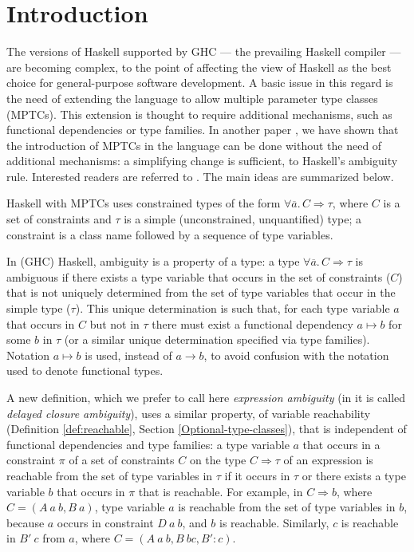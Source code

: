 \section{Introduction}
\label{sec:intro}

The versions of Haskell supported by GHC \cite{GHC} --- the prevailing
Haskell compiler --- are becoming complex, to the point of affecting
the view of Haskell as the best choice for general-purpose software
development. A basic issue in this regard is the need of extending the
language to allow multiple parameter type classes (MPTCs). This
extension is thought to require additional mechanisms, such as
functional dependencies or type families. In another paper
\cite{JBCS-Ambiguity-and-constrained-polymorphism}, we have shown that
the introduction of MPTCs in the language can be done without the need
of additional mechanisms: a simplifying change is sufficient, to
Haskell's ambiguity rule. Interested readers are referred to
\cite{JBCS-Ambiguity-and-constrained-polymorphism}. The main ideas are
summarized below.

Haskell with MPTCs uses constrained types of the form $\forall
\overline{a}.\,C \Rightarrow \tau$, where $C$ is a set of constraints
and $\tau$ is a simple (unconstrained, unquantified) type; a
constraint is a class name followed by a sequence of type variables.

In (GHC) Haskell, ambiguity is a property of a type: a type $\forall
\overline{a}.\,C \Rightarrow \tau$ is ambiguous if there exists a type
variable that occurs in the set of constraints ($C$) that is not
uniquely determined from the set of type variables that occur in the
simple type ($\tau$). This unique determination is such that, for each
type variable $a$ that occurs in $C$ but not in $\tau$ there must
exist a functional dependency $a \mapsto b$ for some $b$ in $\tau$ (or
a similar unique determination specified via type families). Notation
$a \mapsto b$ is used, instead of $a \rightarrow b$, to avoid
confusion with the notation used to denote functional types.

A new definition, which we prefer to call here {\em expression
  ambiguity\/} (in \cite{JBCS-Ambiguity-and-constrained-polymorphism}
it is called {\em delayed closure ambiguity\/}), uses a similar
property, of variable reachability (Definition \ref{def:reachable},
Section \ref{Optional-type-classes}), that is independent of
functional dependencies and type families: a type variable $a$ that
occurs in a constraint $\pi$ of a set of constraints $C$ on the type
$C\Rightarrow\tau$ of an expression is reachable from the set of type
variables in $\tau$ if it occurs in $\tau$ or there exists a type
variable $b$ that occurs in $\pi$ that is reachable. For example, in
$C \Rightarrow b$, where $C=(A\: a\: b, B\: a)$, type variable $a$ is
reachable from the set of type variables in $b$, because $a$ occurs in
constraint $D\: a\: b$, and $b$ is reachable. Similarly, $c$ is
reachable in $B'\: c$ from $a$, where $C=(A\: a\: b, B\: b c, B': c)$.

